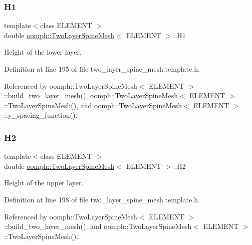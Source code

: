 \subsubsection{\texorpdfstring{H1}{H1}}
{\footnotesize\ttfamily template$<$class E\+L\+E\+M\+E\+NT $>$ \\
double \hyperlink{classoomph_1_1TwoLayerSpineMesh}{oomph\+::\+Two\+Layer\+Spine\+Mesh}$<$ E\+L\+E\+M\+E\+NT $>$\+::H1\hspace{0.3cm}{\ttfamily [protected]}}



Height of the lower layer. 



Definition at line 195 of file two\+\_\+layer\+\_\+spine\+\_\+mesh.\+template.\+h.



Referenced by oomph\+::\+Two\+Layer\+Spine\+Mesh$<$ E\+L\+E\+M\+E\+N\+T $>$\+::build\+\_\+two\+\_\+layer\+\_\+mesh(), oomph\+::\+Two\+Layer\+Spine\+Mesh$<$ E\+L\+E\+M\+E\+N\+T $>$\+::\+Two\+Layer\+Spine\+Mesh(), and oomph\+::\+Two\+Layer\+Spine\+Mesh$<$ E\+L\+E\+M\+E\+N\+T $>$\+::y\+\_\+spacing\+\_\+function().

\mbox{\label{classoomph_1_1TwoLayerSpineMesh_a0a7e5f7297ad653440d7d833c89d1b44}} 
\subsubsection{\texorpdfstring{H2}{H2}}
{\footnotesize\ttfamily template$<$class E\+L\+E\+M\+E\+NT $>$ \\
double \hyperlink{classoomph_1_1TwoLayerSpineMesh}{oomph\+::\+Two\+Layer\+Spine\+Mesh}$<$ E\+L\+E\+M\+E\+NT $>$\+::H2\hspace{0.3cm}{\ttfamily [protected]}}



Height of the upper layer. 



Definition at line 198 of file two\+\_\+layer\+\_\+spine\+\_\+mesh.\+template.\+h.



Referenced by oomph\+::\+Two\+Layer\+Spine\+Mesh$<$ E\+L\+E\+M\+E\+N\+T $>$\+::build\+\_\+two\+\_\+layer\+\_\+mesh(), and oomph\+::\+Two\+Layer\+Spine\+Mesh$<$ E\+L\+E\+M\+E\+N\+T $>$\+::\+Two\+Layer\+Spine\+Mesh().

